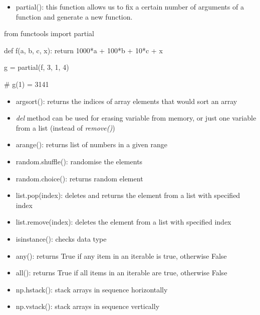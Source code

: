 \documentclass[
  letterpaper,
]{book}
\newenvironment{Shaded}{\begin{snugshade}}{\end{snugshade}}
\newcommand{\CommentTok}[1]{\textcolor[rgb]{0.37,0.37,0.37}{#1}}
\newcommand{\ControlFlowTok}[1]{\textcolor[rgb]{0.00,0.23,0.31}{#1}}
\newcommand{\DecValTok}[1]{\textcolor[rgb]{0.68,0.00,0.00}{#1}}
\newcommand{\ImportTok}[1]{\textcolor[rgb]{0.00,0.46,0.62}{#1}}
\newcommand{\KeywordTok}[1]{\textcolor[rgb]{0.00,0.23,0.31}{#1}}
\newcommand{\NormalTok}[1]{\textcolor[rgb]{0.00,0.23,0.31}{#1}}
\newcommand{\OperatorTok}[1]{\textcolor[rgb]{0.37,0.37,0.37}{#1}}
\providecommand{\tightlist}{%
  \setlength{\itemsep}{0pt}\setlength{\parskip}{0pt}}\usepackage{longtable,booktabs,array}
\begin{document}
\begin{itemize}
\tightlist
\item
  partial(): this function allows us to fix a certain number of
  arguments of a function and generate a new function.
\end{itemize}

\begin{Shaded}
\begin{Highlighting}[]
\ImportTok{from}\NormalTok{ functools }\ImportTok{import}\NormalTok{ partial}

\KeywordTok{def}\NormalTok{ f(a, b, c, x):}
    \ControlFlowTok{return} \DecValTok{1000}\OperatorTok{*}\NormalTok{a }\OperatorTok{+} \DecValTok{100}\OperatorTok{*}\NormalTok{b }\OperatorTok{+} \DecValTok{10}\OperatorTok{*}\NormalTok{c }\OperatorTok{+}\NormalTok{ x}

\NormalTok{g }\OperatorTok{=}\NormalTok{ partial(f, }\DecValTok{3}\NormalTok{, }\DecValTok{1}\NormalTok{, }\DecValTok{4}\NormalTok{)}

\CommentTok{\# g(1) = 3141}
\end{Highlighting}
\end{Shaded}

\begin{itemize}
\tightlist
\item
  argsort(): returns the indices of array elements that would sort an
  array
\item
  \emph{del} method can be used for erasing variable from memory, or
  just one variable from a list (instead of \emph{remove()})
\item
  arange(): returns list of numbers in a given range
\item
  random.shuffle(): randomise the elements
\item
  random.choice(): returns random element
\item
  list.pop(index): deletes and returns the element from a list with
  specified index
\item
  list.remove(index): deletes the element from a list with specified
  index
\item
  isinstance(): checks data type
\item
  any(): returns True if any item in an iterable is true, otherwise
  False
\item
  all(): returns True if all items in an iterable are true, otherwise
  False
\item
  np.hstack(): stack arrays in sequence horizontally
\item
  np.vstack(): stack arrays in sequence vertically
\end{itemize}
\end{document}
